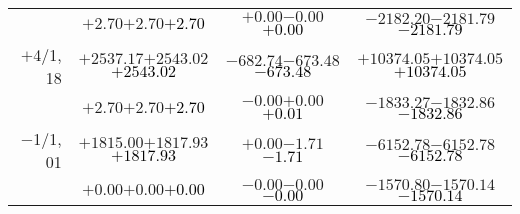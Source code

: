 \documentclass[compress]{beamer}
\begin{document}
\begin{frame}
{\begin{tabular}{r | c | c | c}
           & $+2.70$\hspace{0.1 cm}$+2.70$\hspace{0.1 cm}\textcolor{black}{$+2.70$} & $+0.00$\hspace{0.1 cm}$-0.00$\hspace{0.1 cm}\textcolor{black}{$+0.00$} & $-2182.20$\hspace{0.1 cm}$-2181.79$\hspace{0.1 cm}\textcolor{black}{$-2181.79$} \\
$+$4/1, 18 & $+2537.17$\hspace{0.1 cm}$+2543.02$\hspace{0.1 cm}\textcolor{black}{$+2543.02$} & $-682.74$\hspace{0.1 cm}$-673.48$\hspace{0.1 cm}\textcolor{black}{$-673.48$} & $+10374.05$\hspace{0.1 cm}$+10374.05$\hspace{0.1 cm}\textcolor{black}{$+10374.05$} \\
           & $+2.70$\hspace{0.1 cm}$+2.70$\hspace{0.1 cm}\textcolor{black}{$+2.70$} & $-0.00$\hspace{0.1 cm}$+0.00$\hspace{0.1 cm}\textcolor{black}{$+0.01$} & $-1833.27$\hspace{0.1 cm}$-1832.86$\hspace{0.1 cm}\textcolor{black}{$-1832.86$} \\
$-$1/1, 01 & $+1815.00$\hspace{0.1 cm}$+1817.93$\hspace{0.1 cm}\textcolor{black}{$+1817.93$} & $+0.00$\hspace{0.1 cm}$-1.71$\hspace{0.1 cm}\textcolor{black}{$-1.71$} & $-6152.78$\hspace{0.1 cm}$-6152.78$\hspace{0.1 cm}\textcolor{black}{$-6152.78$} \\
           & $+0.00$\hspace{0.1 cm}$+0.00$\hspace{0.1 cm}\textcolor{black}{$+0.00$} & $-0.00$\hspace{0.1 cm}$-0.00$\hspace{0.1 cm}\textcolor{black}{$-0.00$} & $-1570.80$\hspace{0.1 cm}$-1570.14$\hspace{0.1 cm}\textcolor{black}{$-1570.14$} \\

\end{tabular}}
\end{frame}
\end{document}
